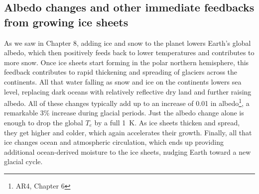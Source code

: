 \documentclass[amstex,12pt]{book}
\begin{document}
\subsection{Albedo changes and other immediate feedbacks from growing ice sheets}
As we saw in Chapter 8, adding ice and snow to the planet lowers Earth's global albedo, which then positively feeds back to lower temperatures and contributes to more snow. Once ice sheets start forming in the polar northern hemisphere, this feedback contributes to rapid thickening and spreading of glaciers across the continents. All that water falling as snow and ice on the continents lowers sea level, replacing dark oceans with relatively reflective dry land and further raising albedo. All of these changes typically add up to an increase of 0.01 in albedo\footnote{AR4, Chapter 6}, a remarkable 3\% increase during glacial periods. Just the albedo change alone is enough to drop the global $T_e$ by a full \SI{1}{K}. As ice sheets thicken and spread, they get higher and colder, which again accelerates their growth. Finally, all that ice changes ocean and atmospheric circulation, which ends up providing additional ocean-derived moisture to the ice sheets, nudging Earth toward a new glacial cycle. \\
\end{document}
